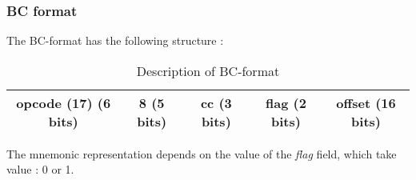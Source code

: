 \subsubsection*{BC format}

	The BC-format has the following structure :
	\begin{table}[H]
		\centering
		\begin{tabular}{|c|c|c|c|c|}
		\hline 
		opcode (17) (6 bits) & 8 (5 bits) & cc (3 bits) & flag (2 bits) & offset (16 bits) \\ 
		\hline 
		\end{tabular} 
		\caption{Description of BC-format}
	\end{table}
	
	The mnemonic representation depends on the value of the \textit{flag} field, which take value : 0 or 1.